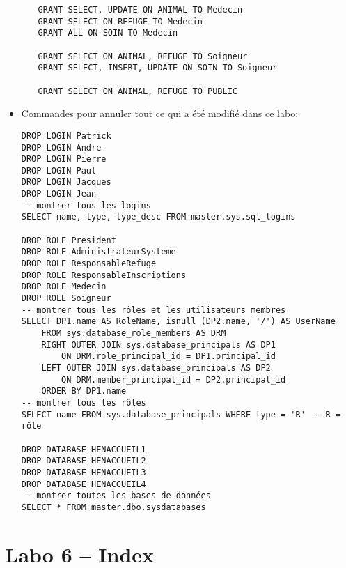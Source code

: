 \documentclass[a4paper]{article}
\begin{document}
\begin{itemize}
\begin{enumerate}
\begin{example}
\begin{verbatim}
GRANT SELECT, UPDATE ON ANIMAL TO Medecin
GRANT SELECT ON REFUGE TO Medecin
GRANT ALL ON SOIN TO Medecin

GRANT SELECT ON ANIMAL, REFUGE TO Soigneur
GRANT SELECT, INSERT, UPDATE ON SOIN TO Soigneur

GRANT SELECT ON ANIMAL, REFUGE TO PUBLIC
\end{verbatim}

\end{example}

\end{enumerate}



\item Commandes pour annuler tout ce qui a été modifié dans ce labo:
\begin{example} \begin{verbatim}
DROP LOGIN Patrick
DROP LOGIN Andre
DROP LOGIN Pierre
DROP LOGIN Paul
DROP LOGIN Jacques
DROP LOGIN Jean
-- montrer tous les logins
SELECT name, type, type_desc FROM master.sys.sql_logins

DROP ROLE President
DROP ROLE AdministrateurSysteme
DROP ROLE ResponsableRefuge
DROP ROLE ResponsableInscriptions
DROP ROLE Medecin
DROP ROLE Soigneur
-- montrer tous les rôles et les utilisateurs membres
SELECT DP1.name AS RoleName, isnull (DP2.name, '/') AS UserName
    FROM sys.database_role_members AS DRM
    RIGHT OUTER JOIN sys.database_principals AS DP1
        ON DRM.role_principal_id = DP1.principal_id
    LEFT OUTER JOIN sys.database_principals AS DP2
        ON DRM.member_principal_id = DP2.principal_id
    ORDER BY DP1.name
-- montrer tous les rôles
SELECT name FROM sys.database_principals WHERE type = 'R' -- R = rôle

DROP DATABASE HENACCUEIL1
DROP DATABASE HENACCUEIL2
DROP DATABASE HENACCUEIL3
DROP DATABASE HENACCUEIL4
-- montrer toutes les bases de données
SELECT * FROM master.dbo.sysdatabases
\end{verbatim} \end{example}



\end{itemize}















\section{Labo 6 -- Index}
\end{document}
